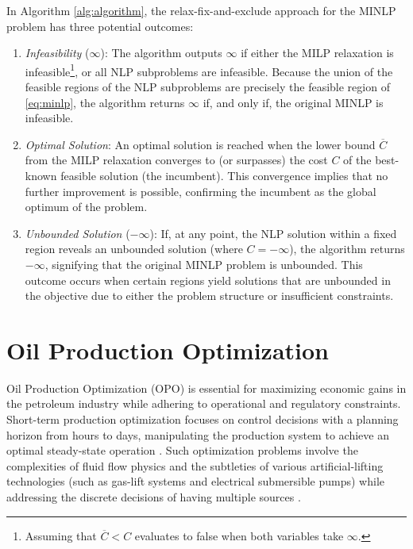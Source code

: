 \documentclass[pdflatex,sn-mathphys-num]{sn-jnl}%
\newcommand{\new}[1]{#1}
\begin{document}
In Algorithm \ref{alg:algorithm}, the relax-fix-and-exclude approach for the MINLP problem has three potential outcomes: 
\begin{enumerate}
\item  \textit{Infeasibility} (\(\infty\)): \new{%
The algorithm outputs \(\infty\) if either the MILP relaxation is infeasible\footnote{\new{Assuming that $\overline{C} < C$ evaluates to false when both variables take $\infty$.}}, or all NLP subproblems are infeasible.
Because the union of the feasible regions of the NLP subproblems are precisely the feasible region of \ref{eq:minlp},  the algorithm returns \(\infty\) if, and only if, the original MINLP is infeasible.
}

\item  \textit{Optimal Solution}: An optimal solution is reached when the lower bound $\overline{C}$ \new{from the MILP relaxation} converges to \new{(or surpasses) the cost} $C$ of the best-known feasible solution (the incumbent). This convergence implies that no further improvement is possible, confirming the incumbent as the global optimum of the problem.

\item  \textit{Unbounded Solution} (\(-\infty\)): If, at any point, the NLP solution within a fixed region reveals an unbounded solution (where \(C = -\infty\)), the algorithm returns \(-\infty\), signifying that the original MINLP problem is unbounded. This outcome occurs when certain regions yield solutions that are unbounded in the objective due to either the problem structure or insufficient constraints.
\end{enumerate}





\section{Oil Production Optimization} \label{sec:oil-production-optimization}

Oil Production Optimization (OPO) \citep{foss_jenson} is essential for maximizing economic gains in the petroleum industry while adhering to operational and regulatory constraints.
  Short-term production optimization focuses on control decisions with a planning horizon from hours to days, manipulating the production system to achieve an optimal steady-state operation \citep{Muller2022}.
Such optimization problems involve the complexities of fluid flow physics and the subtleties of various artificial-lifting technologies (such as gas-lift systems and electrical submersible pumps) while addressing the discrete decisions of having multiple sources \citep{CODAS2012222}.
\end{document}

